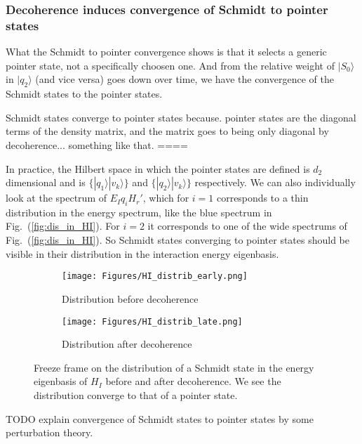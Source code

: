 \documentclass{article}
\begin{document}
\subsubsection{Decoherence induces convergence of Schmidt to pointer states}


What the Schmidt to pointer convergence shows is that it selects a generic pointer state, not a specifically choosen one.
And from the relative weight of $|S_0\rangle$ in $|q_2\rangle$ (and vice versa) goes down over time, we have the convergence of the Schmidt states to the pointer states. 





Schmidt states converge to pointer states because. pointer states are the diagonal terms of the density matrix, and the matrix goes to being only diagonal by decoherence... something like that.
====




In practice, the Hilbert space in which the pointer states are defined is $d_2$ dimensional and is $\{|q_1\rangle|v_k\rangle\}$ and $\{|q_2\rangle|v_k\rangle\}$ respectively. We can also individually look at the spectrum of $E_Iq_iH_r'$, which for $i=1$ corresponds to a thin distribution in the energy spectrum, like the blue spectrum in Fig.~(\ref{fig:dis_in_HI}). For $i=2$ it corresponds to one of the wide spectrums of Fig.~(\ref{fig:dis_in_HI}). So Schmidt states converging to pointer states should be visible in their distribution in the interaction energy eigenbasis.

\begin{figure}[h!]
  \centering
  \begin{subfigure}[b]{0.49\linewidth}
    \texttt{[image: Figures/HI\_distrib\_early.png]}
    \label{fig:1}
    \caption{Distribution before decoherence}
  \end{subfigure}
  \begin{subfigure}[b]{0.49\linewidth}
    \texttt{[image: Figures/HI\_distrib\_late.png]}
    \label{fig:2}
    \caption{Distribution after decoherence}
  \end{subfigure}
  \caption{}
  \label{fig:dist_EI_dep}
  \caption{Freeze frame on the distribution of a Schmidt state in the energy eigenbasis of $H_I$ before and after decoherence. We see the distribution converge to that of a pointer state.}
\end{figure}


TODO explain convergence of Schmidt states to pointer states by some perturbation theory. 
\end{document}
